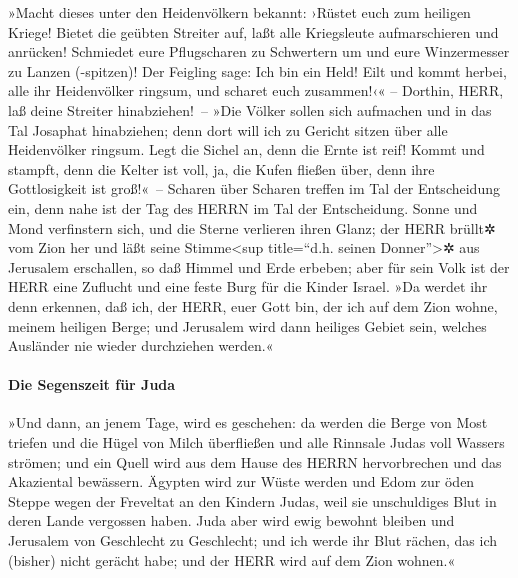 »Macht dieses unter den Heidenvölkern bekannt: ›Rüstet
euch zum heiligen Kriege! Bietet die geübten Streiter auf, laßt alle
Kriegsleute aufmarschieren und anrücken! Schmiedet eure
Pflugscharen zu Schwertern um und eure Winzermesser zu Lanzen
(-spitzen)! Der Feigling sage: Ich bin ein Held! Eilt und
kommt herbei, alle ihr Heidenvölker ringsum, und scharet euch
zusammen!‹« -- Dorthin, HERR, laß deine Streiter hinabziehen!~--
»Die Völker sollen sich aufmachen und in das Tal Josaphat
hinabziehen; denn dort will ich zu Gericht sitzen über alle Heidenvölker
ringsum. Legt die Sichel an, denn die Ernte ist reif!
Kommt und stampft, denn die Kelter ist voll, ja, die Kufen fließen über,
denn ihre Gottlosigkeit ist groß!«~-- Scharen über
Scharen treffen im Tal der Entscheidung ein, denn nahe ist der Tag des
HERRN im Tal der Entscheidung. Sonne und Mond verfinstern
sich, und die Sterne verlieren ihren Glanz; der HERR
brüllt✲ vom Zion her und läßt seine Stimme\textless sup title=``d.h.
seinen Donner''\textgreater✲ aus Jerusalem erschallen, so daß Himmel und
Erde erbeben; aber für sein Volk ist der HERR eine Zuflucht und eine
feste Burg für die Kinder Israel. »Da werdet ihr denn
erkennen, daß ich, der HERR, euer Gott bin, der ich auf dem Zion wohne,
meinem heiligen Berge; und Jerusalem wird dann heiliges Gebiet sein,
welches Ausländer nie wieder durchziehen werden.«

\hypertarget{die-segenszeit-fuxfcr-juda}{%
\paragraph{Die Segenszeit für Juda}\label{die-segenszeit-fuxfcr-juda}}

»Und dann, an jenem Tage, wird es geschehen: da werden
die Berge von Most triefen und die Hügel von Milch überfließen und alle
Rinnsale Judas voll Wassers strömen; und ein Quell wird aus dem Hause
des HERRN hervorbrechen und das Akaziental bewässern.
Ägypten wird zur Wüste werden und Edom zur öden Steppe
wegen der Freveltat an den Kindern Judas, weil sie unschuldiges Blut in
deren Lande vergossen haben. Juda aber wird ewig bewohnt
bleiben und Jerusalem von Geschlecht zu Geschlecht; und
ich werde ihr Blut rächen, das ich (bisher) nicht gerächt habe; und der
HERR wird auf dem Zion wohnen.«
